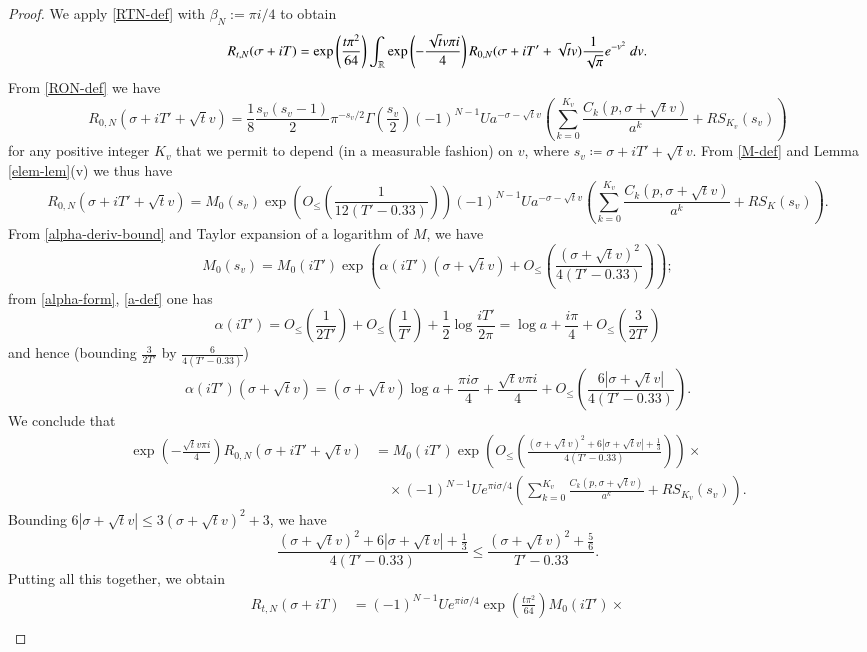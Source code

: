 \begin{proof}  We apply \eqref{RTN-def} with $\beta_N := \pi i/4$ to obtain
$$ R_{t,N}(\sigma+iT) = \exp\left( \frac{t \pi^2}{64}\right) \int_{\mathbb{R}} \exp\left( - \frac{\sqrt{t} v \pi i}{4}\right) R_{0,N}( \sigma+iT' + \sqrt{t} v) \frac{1}{\sqrt{\pi}} e^{-v^2}\ dv.$$
From \eqref{RON-def} we have
$$ R_{0,N}( \sigma+iT' + \sqrt{t} v) = \frac{1}{8} \frac{s_v(s_v-1)}{2} \pi^{-s_v/2} \Gamma\left(\frac{s_v}{2}\right) (-1)^{N-1} U a^{-\sigma-\sqrt{t} v}
\left(\sum_{k=0}^{K_v} \frac{C_k(p,\sigma + \sqrt{t} v)}{a^k} + RS_{K_v}(s_v)\right) $$
for any positive integer $K_v$ that we permit to depend (in a measurable fashion) on $v$, where $s_v \coloneqq \sigma + iT' + \sqrt{t} v$. From \eqref{M-def} and Lemma \ref{elem-lem}(v) we thus have
$$ R_{0,N}( \sigma+iT' + \sqrt{t} v) = M_0(s_v) \exp\left( O_{\leq}\left(\frac{1}{12(T'-0.33)}\right) \right) (-1)^{N-1} U a^{-\sigma-\sqrt{t} v}
\left(\sum_{k=0}^{K_v} \frac{C_k(p,\sigma + \sqrt{t} v)}{a^k} + RS_K(s_v)\right).$$
From \eqref{alpha-deriv-bound} and Taylor expansion of a logarithm of $M$, we have
$$ M_0(s_v) = M_0(iT') \exp\left( \alpha(iT') (\sigma + \sqrt{t} v) + O_{\leq}\left( \frac{(\sigma + \sqrt{t} v)^2}{4(T'-0.33)} \right) \right);$$
from \eqref{alpha-form}, \eqref{a-def} one has
$$ \alpha(iT') = O_{\leq}\left( \frac{1}{2T'}\right) + O_{\leq}\left( \frac{1}{T'}\right) + \frac{1}{2} \log \frac{iT'}{2\pi} = \log a + \frac{i\pi}{4} + O_{\leq}\left( \frac{3}{2T'}\right)$$
and hence (bounding $\frac{3}{2T'}$ by $\frac{6}{4(T'-0.33)}$)
$$ \alpha(iT') (\sigma + \sqrt{t} v)  = (\sigma + \sqrt{t} v)  \log a + \frac{\pi i \sigma}{4} + \frac{\sqrt{t} v \pi i}{4} + O_{\leq}\left( \frac{6 |\sigma+\sqrt{t} v|}{4(T'-0.33)} \right).$$ 
We conclude that
\begin{align*}
\exp\left( - \frac{\sqrt{t} v \pi i}{4}\right) R_{0,N}( \sigma+iT' + \sqrt{t} v) &= 
M_0(iT') \exp\left( O_{\leq}\left(\frac{(\sigma + \sqrt{t} v)^2+6|\sigma+\sqrt{t} v|+\frac{1}{3}}{4(T'-0.33)} \right)\right) \times \\
&\quad \times (-1)^{N-1} U  e^{\pi i \sigma/4} \left(\sum_{k=0}^{K_v} \frac{C_k(p, \sigma+\sqrt{t} v)}{a^k} + RS_{K_v}(s_v)\right).
\end{align*}
Bounding $6|\sigma+\sqrt{t} v| \leq 3 (\sigma + \sqrt{t} v)^2 + 3$, we have
$$ \frac{(\sigma + \sqrt{t} v)^2+6|\sigma+\sqrt{t} v|+\frac{1}{3}}{4(T'-0.33)}  \leq \frac{(\sigma + \sqrt{t} v)^2 + \frac{5}{6}}{T'-0.33}.$$
Putting all this together, we obtain
\begin{align*}
 R_{t,N}(\sigma+iT) &= (-1)^{N-1} U e^{\pi i \sigma/4} \exp\left( \frac{t \pi^2}{64}\right) M_0(iT') \times \\

\end{align*}
\end{proof}
